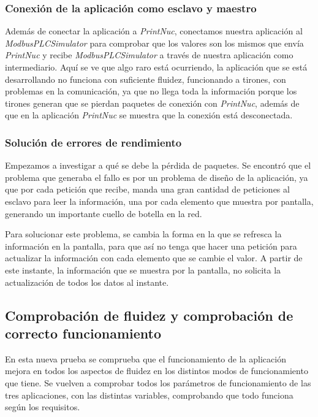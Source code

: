 \documentclass[pdftex,11pt,a4paper]{book}
\begin{document}
\subsubsection{Conexión de la aplicación como esclavo y maestro}
Además de conectar la aplicación a \emph{PrintNuc}, conectamos nuestra aplicación al \emph{ModbusPLCSimulator} para comprobar que los valores son los mismos que envía \emph{PrintNuc} y recibe \emph{ModbusPLCSimulator} a través de nuestra aplicación como intermediario. Aquí se ve que algo raro está ocurriendo, la aplicación que se está desarrollando no funciona con suficiente fluidez, funcionando a tirones, con problemas en la comunicación, ya que no llega toda la información porque los tirones generan que se pierdan paquetes de conexión con \emph{PrintNuc}, además de que en la aplicación \emph{PrintNuc} se muestra que la conexión está desconectada.

\subsubsection{Solución de errores de rendimiento}


Empezamos a investigar a qué se debe la pérdida de paquetes. Se encontró que el problema que generaba el fallo es por un problema de diseño de la aplicación, ya que por cada petición que recibe, manda una gran cantidad de peticiones al esclavo para leer la información, una por cada elemento que muestra por pantalla, generando un importante cuello de botella en la red.

Para solucionar este problema, se cambia la forma en la que se refresca la información en la pantalla, para que así no tenga que hacer una petición para actualizar la información con cada elemento que se cambie el valor. A partir de este instante, la información que se muestra por la pantalla, no solicita la actualización de todos los datos al instante.

\subsection{Comprobación de fluidez y comprobación de correcto funcionamiento}

En esta nueva prueba se comprueba que el funcionamiento de la aplicación mejora en todos los aspectos de fluidez en los distintos modos de funcionamiento que tiene. Se vuelven a comprobar todos los parámetros de funcionamiento de las tres aplicaciones, con las distintas variables, comprobando que todo funciona según los requisitos.
\end{document}
